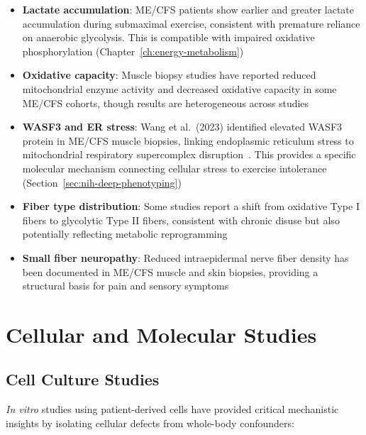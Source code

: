 \begin{itemize}
    \item \textbf{Lactate accumulation}: ME/CFS patients show earlier and greater lactate accumulation during submaximal exercise, consistent with premature reliance on anaerobic glycolysis. This is compatible with impaired oxidative phosphorylation (Chapter~\ref{ch:energy-metabolism})
    \item \textbf{Oxidative capacity}: Muscle biopsy studies have reported reduced mitochondrial enzyme activity and decreased oxidative capacity in some ME/CFS cohorts, though results are heterogeneous across studies
    \item \textbf{WASF3 and ER stress}: Wang et al.\ (2023) identified elevated WASF3 protein in ME/CFS muscle biopsies, linking endoplasmic reticulum stress to mitochondrial respiratory supercomplex disruption~\cite{wang2023wasf3}. This provides a specific molecular mechanism connecting cellular stress to exercise intolerance (Section~\ref{sec:nih-deep-phenotyping})
    \item \textbf{Fiber type distribution}: Some studies report a shift from oxidative Type I fibers to glycolytic Type II fibers, consistent with chronic disuse but also potentially reflecting metabolic reprogramming
    \item \textbf{Small fiber neuropathy}: Reduced intraepidermal nerve fiber density has been documented in ME/CFS muscle and skin biopsies, providing a structural basis for pain and sensory symptoms
\end{itemize}

\section{Cellular and Molecular Studies}
\label{sec:cellular-studies}

\subsection{Cell Culture Studies}

\textit{In vitro} studies using patient-derived cells have provided critical mechanistic insights by isolating cellular defects from whole-body confounders:

